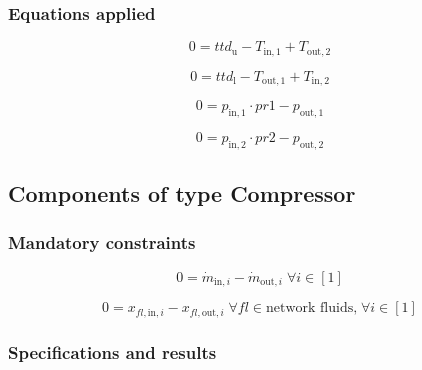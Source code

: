 \subsubsection{Equations applied}

\begin{equation}
\label{eq:HeatExchanger_ttd_u}
0 = ttd_\mathrm{u} - T_\mathrm{in,1} + T_\mathrm{out,2}
\end{equation}

\begin{equation}
\label{eq:HeatExchanger_ttd_l}
0 = ttd_\mathrm{l} - T_\mathrm{out,1} + T_\mathrm{in,2}
\end{equation}

\begin{equation}
\label{eq:HeatExchanger_pr1}
0=p_\mathrm{in,1}\cdot pr1 - p_\mathrm{out,1}
\end{equation}

\begin{equation}
\label{eq:HeatExchanger_pr2}
0=p_\mathrm{in,2}\cdot pr2 - p_\mathrm{out,2}
\end{equation}


\subsection{Components of type Compressor}

\subsubsection{Mandatory constraints}

\begin{equation}
\label{eq:Compressor_mass_flow_constraints}
0=\dot{m}_{\mathrm{in,}i}-\dot{m}_{\mathrm{out,}i}\; \forall i \in [1]
\end{equation}

\begin{equation}
\label{eq:Compressor_fluid_constraints}
0=x_{fl\mathrm{,in,}i}-x_{fl\mathrm{,out,}i}\;\forall fl \in\text{network fluids,}\; \forall i \in [1]
\end{equation}


\subsubsection{Specifications and results}

